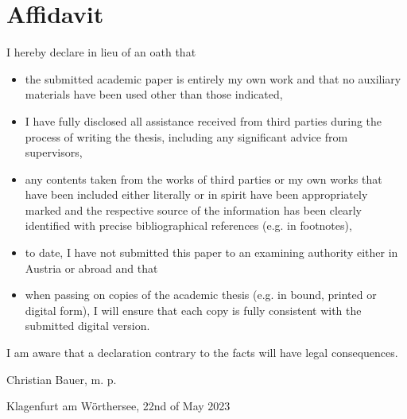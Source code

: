 \section*{Affidavit}
\label{sec:affidavit}

    I hereby declare in lieu of an oath that

    \begin{itemize}
        \item the submitted academic paper is entirely my own work and that no auxiliary materials have been used other than those indicated,
        \item I have fully disclosed all assistance received from third parties during the process of writing the thesis, including any significant advice from supervisors,
        \item any contents taken from the works of third parties or my own works that have been included either literally or in spirit have been appropriately marked and the respective source of the information has been clearly identified with precise bibliographical references (e.g. in footnotes),
        \item to date, I have not submitted this paper to an examining authority either in Austria or abroad and that
        \item when passing on copies of the academic thesis (e.g. in bound, printed or digital form), I will ensure that each copy is fully consistent with the submitted digital version.
    \end{itemize}

    I am aware that a declaration contrary to the facts will have legal consequences.

    \vfill
    \begin{minipage}{.5\textwidth}
        Christian Bauer, m. p.
        
    \end{minipage}%
    \begin{minipage}{.5\textwidth}
        Klagenfurt am Wörthersee, 22nd of May 2023
    \end{minipage}
